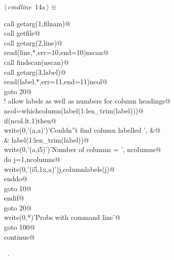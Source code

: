 \documentclass[10pt,a4paper,notitlepage]{article}
\begin{document}
\begin{flushleft} \small
\begin{minipage}{\linewidth}\label{scrap16}\raggedright\small
{} $\langle\,${\it cmdline}\nobreak\ {\footnotesize {14a}}$\,\rangle\equiv$
\vspace{-1ex}
\begin{list}{}{} \item
\mbox{}\verb@      call getarg(1,filnam)@\\
\mbox{}\verb@      call getfile@\\
\mbox{}\verb@      call getarg(2,line)@\\
\mbox{}\verb@      read(line,*,err=10,end=10)nscan@\\
\mbox{}\verb@      call findscan(nscan)@\\
\mbox{}\verb@      call getarg(3,label)@\\
\mbox{}\verb@      read(label,*,err=11,end=11)ncol@\\
\mbox{}\verb@      goto 20@\\
\mbox{}\verb@! allow labels as well as numbers for column headings@\\
\mbox{}    ncol=whichcolumn(label(1:len_trim(label)))@\\
\mbox{}\verb@      if(ncol.lt.1)then@\\
\mbox{}\verb@       write(0,'(a,a)')'Couldn''t find column labelled ',                 &@\\
\mbox{}\verb@     &        label(1:len_trim(label))@\\
\mbox{}\verb@       write(0,'(a,i5)')'Number of columns = ', ncolumns@\\
\mbox{}\verb@       do j=1,ncolumns@\\
\mbox{}\verb@        write(0,'(i5,1x,a)')j,columnlabels(j)@\\
\mbox{}\verb@       enddo@\\
\mbox{}\verb@       goto 10@\\
\mbox{}\verb@      endif@\\
\mbox{}\verb@      goto 20@\\
\mbox{}    write(0,*)'Probs with command line'@\\
\mbox{}\verb@      goto 100@\\
\mbox{}    continue@\\
\mbox{}\verb@@{\NWsep}
\end{list}
\vspace{-1.5ex}
\footnotesize
\begin{list}{}{\setlength{\itemsep}{-\parsep}\setlength{\itemindent}{-\leftmargin}}
\item \NWtxtMacroRefIn\ .

\item{}
\end{list}
\end{minipage}\vspace{4ex}
\end{flushleft}
\end{document}
